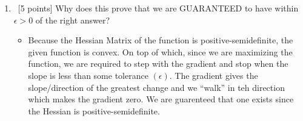 \begin{enumerate}
\begin{itemize}
\begin{align}
\alpha_{1},\alpha_{2}>0 \Rightarrow \alpha_{1}\alpha_{2}(x_{2}+x_{3})>0\\
\alpha_{1}\alpha_{2}(x_{2}+x_{3}) &= 2\alpha_{1}\alpha_{2}\varsigma_{i}e^{\varsigma_{i}}-2e^{\varsigma_{i}}-2>0\\
&\underbrace{\varsigma_{i}e^{\varsigma_{i}}-e^{\varsigma_{i}}-1}_{>\ 0\text{ if }\varsigma_{i}e^{\varsigma_{i}}>e^{\varsigma_{i}}-1};\quad\varsigma_{i}\neq 0\\
&\Rightarrow \varsigma_{i}e^{\varsigma_{i}}>e^{\varsigma_{i}}-1\\
&\Rightarrow \varsigma_{i}>1-e^{-\varsigma_{i}}\qed
\intertext{where $\varsigma_{i}\geq 1\ \forall\ i$. Now for the alternative case where if $\alpha_{1}>0$ and $\alpha_{2}<0$, that $\alpha_{1}^{2}x_{1}+\alpha_{2}^{2}x_{2}>\alpha_{1}\alpha_{2}(x_{2}+x_{3})$}
\alpha_{1}^{2}e^{\varsigma_{i}}+\alpha_{2}^{2}\left(e^{\varsigma_{i}}+\frac{2}{\sigma^{2}}\right) &> \alpha_{1}\alpha_{2}\left[ e^{\varsigma_{i}}(\varsigma_{i}-1)-1 \right]\\
\left[ \alpha_{1}^{2} + \alpha_{2}^{2} + \frac{2}{\sigma^{2}e^{\varsigma_{i}}}\right] &> \left[ \alpha_{1}\alpha_{2}(\varsigma_{i}-1)-e^{-\varsigma_{i}} \right]\\
\intertext{if $\varsigma_{i}\gg 1$}
\underbrace{\alpha_{1}^{2}+\alpha_{2}^{2}}_{>\ 0} &> \underbrace{\alpha_{1}\alpha_{2}}_{<\ 0}\underbrace{\left(\varsigma_{i}-1 \right)}_{>\ 0}\qed
\intertext{for $\varsigma_{i}\geq 0$ (always)}
\underbrace{\alpha_{1}^{2}+\alpha_{2}^{2}}_{>\ 0}+\underbrace{e^{-\varsigma_{i}}}_{\geq\ 1}\underbrace{\left(\frac{2}{\sigma^{2}}+1\right)}_{>\ 0} &> \underbrace{\alpha_{1}\alpha_{2}}_{<\ 0}\underbrace{(\varsigma_{i}-1)}_{>\ 0}\qed
\end{align}
\end{itemize}
\item ~[5 points] Why does this prove that we are GUARANTEED to have within $\epsilon>0$ of the right answer?
\begin{itemize}
\item Because the Hessian Matrix of the function is positive-semidefinite, the given function is convex. On top of which, since we are maximizing the function, we are required to step with the gradient and stop when the slope is less than some tolerance $(\epsilon)$. The gradient gives the slope/direction of the greatest change and we ``walk'' in teh direction which makes the gradient zero. We are guarenteed that one exists since the Hessian is positive-semidefinite.
\end{itemize}
\end{enumerate}

